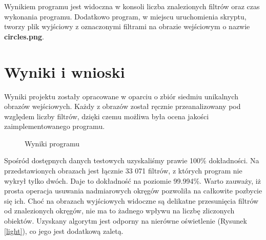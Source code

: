 \documentclass[12pt]{article}
\begin{document}
Wynikiem programu jest widoczna w konsoli liczba znalezionych filtrów oraz czas wykonania programu. Dodatkowo program, w miejscu uruchomienia skryptu, tworzy plik wyjściowy z oznaczonymi filtrami na obrazie wejściowym o nazwie \textbf{circles.png}.

\section{Wyniki i wnioski}
Wyniki projektu zostały opracowane w oparciu o zbiór siedmiu unikalnych obrazów wejściowych. Każdy z obrazów został ręcznie przeanalizowany pod względem liczby filtrów, dzięki czemu możliwa była ocena jakości zaimplementowanego programu.

\begin{figure}[H]%
\centering
{}%
\qquad
{}%
\qquad
{}%
\qquad
{}%
\qquad
{}%
\qquad
{}%
\qquad
{}%

\caption{Wyniki programu}
\label{results1}
\end{figure}

Spośród dostępnych danych testowych uzyskaliśmy prawie 100\% dokładności. Na przedstawionych obrazach jest łącznie 33 071 filtrów, z których program nie wykrył tylko dwóch. Daje to dokładność na poziomie 99.994\%. Warto zauważy, iż prosta operacja usuwania nadmiarowych okręgów pozwoliła na całkowite pozbycie się ich. Choć na obrazach wyjściowych widoczne są delikatne przesunięcia filtrów od znalezionych okręgów, nie ma to żadnego wpływu na liczbę zliczonych obiektów. Uzyskany algorytm jest odporny na nierówne oświetlenie (Rysunek \ref{light}), co jego jest dodatkową zaletą. 
\end{document}
